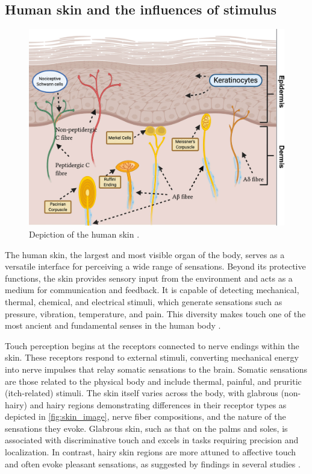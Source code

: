 \subsection{Human skin and the influences of stimulus}
\begin{figure}
    \centering
    \includegraphics[width=0.7\linewidth]{src//pictures/skin.jpg}
    \caption{Depiction of the human skin \cite{lowy2021cutaneous}.}
    \label{fig:skin_image}
\end{figure}

The human skin, the largest and most visible organ of the body, serves as a versatile interface for perceiving a wide range of sensations. Beyond its protective functions, the skin provides sensory input from the environment and acts as a medium for communication and feedback. It is capable of detecting mechanical, thermal, chemical, and electrical stimuli, which generate sensations such as pressure, vibration, temperature, and pain. This diversity makes touch one of the most ancient and fundamental senses in the human body \cite{Fang2023}.

Touch perception begins at the receptors connected to nerve endings within the skin. These receptors respond to external stimuli, converting mechanical energy into nerve impulses that relay somatic sensations to the brain. Somatic sensations are those related to the physical body and include thermal, painful, and pruritic (itch-related) stimuli. The skin itself varies across the body, with glabrous (non-hairy) and hairy regions demonstrating differences in their receptor types as depicted in \autoref{fig:skin_image}, nerve fiber compositions, and the nature of the sensations they evoke. Glabrous skin, such as that on the palms and soles, is associated with discriminative touch and excels in tasks requiring precision and localization. In contrast, hairy skin regions are more attuned to affective touch and often evoke pleasant sensations, as suggested by findings in several studies \cite{Fang2023, ackerley2014quantifying,ackerley2016touch}.



